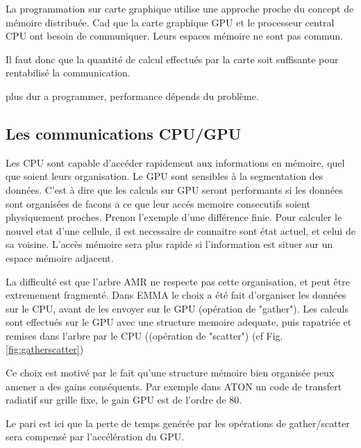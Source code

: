 La programmation sur carte graphique utilise une approche proche du concept de mémoire distribuée.
Cad que la carte graphique GPU et le processeur central CPU ont besoin de communiquer.
Leurs espaces mémoire ne sont pas commun.

Il faut donc que la quantité de calcul effectués par la carte soit suffisante pour rentabilisé la communication.


plus dur a programmer, performance dépends du problème.





\subsection{Les communications CPU/GPU}

Les CPU sont capable d'accéder rapidement aux informations en mémoire, quel que soient leurs organisation.
Le GPU sont sensibles à la segmentation des données.
C'est à dire que les calculs sur GPU seront performants si les données sont organisées de facons a ce que leur accés memoire consecutifs soient physiquement proches.
Prenon l'exemple d'une différence finie. 
Pour calculer le nouvel etat d'une cellule, il est necessaire de connaitre sont état actuel, et celui de sa voisine.
L'accès mémoire sera plus rapide si l'information est situer sur un espace mémoire adjacent.

La difficulté est que l'arbre AMR ne respecte pas cette organisation, et peut être extremement fragmenté.
Dans EMMA le choix a été fait d'organiser les données sur le CPU, avant de les envoyer sur le GPU (opération de "gather").
Les calculs sont effectués sur le GPU avec une structure memoire adequate, puis rapatriée et remises dans l'arbre par le CPU ((opération de "scatter") (cf Fig. \ref{fig:gatherscatter})

Ce choix est motivé par le fait qu'une structure mémoire bien organisée peux amener a des gains conséquents.
Par exemple dans ATON %
un code de transfert radiatif sur grille fixe, le gain GPU est de l'ordre de 80.

Le pari est ici que la perte de temps genérée par les opérations de gather/scatter sera compensé par l'accélération du GPU.


